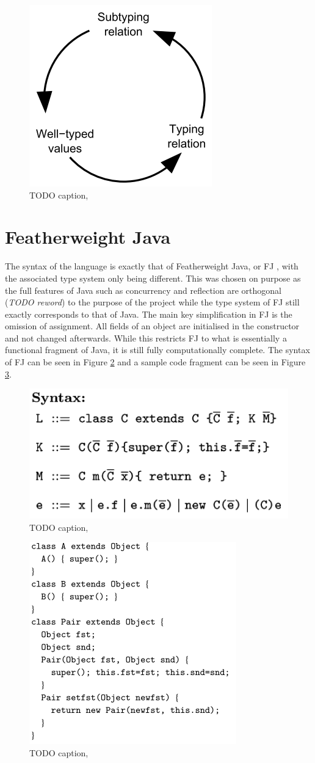 \documentclass{l4proj}
\begin{document}
\begin{figure}
    \centering
    \includegraphics[width=0.4\linewidth]{images/circularity.PNG}
    \caption{TODO caption, \citep{Castagna2005}}
    \label{fig:circ}
\end{figure}

\section{Featherweight Java}

The syntax of the language is exactly that of Featherweight Java, or FJ \citep{Igarashi1999}, with 
the associated type system only being different. This was chosen on purpose as the full features of 
Java such as concurrency and reflection are orthogonal (\textit{TODO reword}) to the purpose of the 
project while the type system of FJ still exactly corresponds to that of Java. The main key 
simplification in FJ is the omission of assignment. All fields of an object are initialised in the
constructor and not changed afterwards. While this restricts FJ to what is essentially a functional 
fragment of Java, it is still fully computationally complete. The syntax of FJ can be seen in Figure
\ref{fig:syntax} and a sample code fragment can be seen in Figure \ref{fig:class}.

\begin{figure}
    \centering
    \includegraphics[width=0.4\linewidth]{images/syntax.PNG}
    \caption{TODO caption, \citep{Igarashi1999}}
    \label{fig:syntax}
\end{figure}

\begin{figure}
    \centering
    \includegraphics[width=0.4\linewidth]{images/class.PNG}
    \caption{TODO caption, \citep{Igarashi1999}}
    \label{fig:class}
\end{figure}
\end{document}
